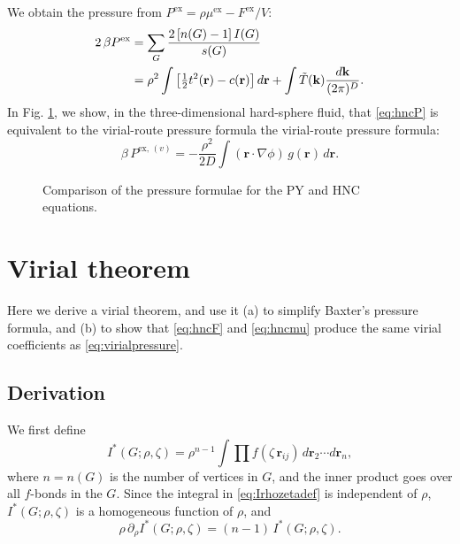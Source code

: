 \documentclass[preprint]{revtex4-1}
\newcommand{\vct}[1]{\mathbf{#1}}
\providecommand{\vr}{} %
\renewcommand{\vr}{\vct{r}}
\newcommand{\vk}{\vct{k}}
\newcommand{\dvk}{\frac{d\vk}{(2\pi)^D}}
\newcommand{\supex}[1]{ { { #1 }^{ \mathrm{ex} } } }
\newcommand{\supexv}[1]{ { { #1 }^{ \mathrm{ex}, \, (v) } } }
\newcommand{\Pex}{\supex{P}}
\newcommand{\Pexv}{\supexv{P}}
\newcommand{\Fex}{\supex{F}}
\newcommand{\muex}{\supex{\mu}}
\begin{document}
We obtain the pressure from
  $\Pex = \rho \muex - \Fex/V$:
%
\begin{align}
2 \, \beta \Pex
&=
\sum_G \frac{ 2 \, [n(G) - 1] \, I(G) } { s(G) }
\notag \\
&=
\rho^2 \int
  \left[
    \tfrac{1}{2} t^2(\vr) - c(\vr)
  \right] d\vr
  +\int \tilde T(\vk) \dvk.
\label{eq:hncP}
\end{align}
%
In Fig. \ref{fig:iepres},
we show, in the three-dimensional hard-sphere fluid,
that
\eqref{eq:hncP}
is equivalent to the virial-route pressure formula
%
the virial-route pressure formula:
\begin{equation}
  \beta \, \Pexv
=
  - \frac{\rho^2}{2D}
  \int (\vr \cdot \nabla\phi) \, g(\vr) \, d\vr.
\label{eq:virialpressure}
\end{equation}

\begin{figure}[h]
  \caption{\label{fig:iepres}
  Comparison of the pressure formulae for the PY and HNC equations.}
\end{figure}







\section{Virial theorem}

Here we derive a virial theorem,
and use it
(a) to simplify Baxter's pressure formula,
and
(b) to show that \eqref{eq:hncF} and \eqref{eq:hncmu}
produce the same virial coefficients as \eqref{eq:virialpressure}.



\subsection{Derivation}

We first define
\begin{equation}
  I^*(G; \rho, \zeta)
  = \rho^{n-1} \int \prod f(\zeta \, \vr_{ij}) \, d\vr_2 \cdots d\vr_n,
  \label{eq:Irhozetadef}
\end{equation}
where $n = n(G)$ is the number of vertices in $G$,
and the inner product goes over all $f$-bonds in the $G$.
Since the integral in \eqref{eq:Irhozetadef} is independent of $\rho$,
$I^*(G;\rho, \zeta)$ is a homogeneous function of $\rho$, and
%
\begin{equation}
  \rho \, \partial_\rho I^*(G; \rho, \zeta)
  = (n - 1) \, I^*(G; \rho, \zeta).
  \label{eq:Idrho}
\end{equation}
\end{document}
